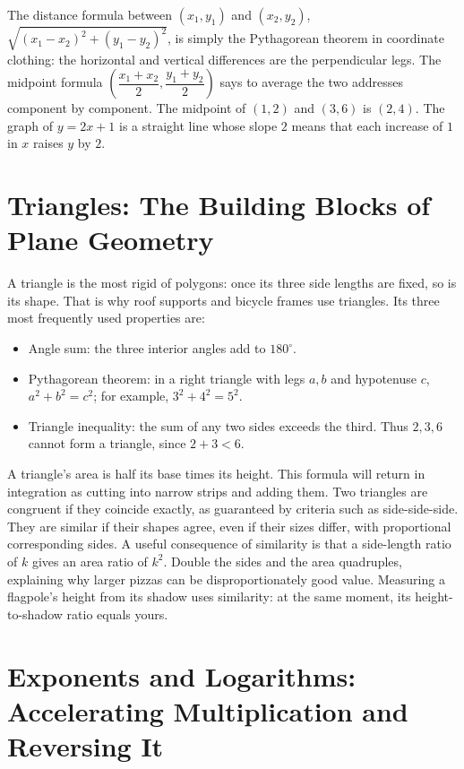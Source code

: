 The distance formula between $(x_1,y_1)$ and $(x_2,y_2)$, $\sqrt{(x_1-x_2)^2+(y_1-y_2)^2}$, is simply the Pythagorean theorem in coordinate clothing: the horizontal and vertical differences are the perpendicular legs. The midpoint formula $\left(\dfrac{x_1+x_2}{2},\dfrac{y_1+y_2}{2}\right)$ says to average the two addresses component by component. The midpoint of $(1,2)$ and $(3,6)$ is $(2,4)$. The graph of $y=2x+1$ is a straight line whose slope $2$ means that each increase of $1$ in $x$ raises $y$ by $2$.

\section{Triangles: The Building Blocks of Plane Geometry}

A triangle is the most rigid of polygons: once its three side lengths are fixed, so is its shape. That is why roof supports and bicycle frames use triangles. Its three most frequently used properties are:

\begin{itemize}
\item Angle sum: the three interior angles add to $180^\circ$.
\item Pythagorean theorem: in a right triangle with legs $a,b$ and hypotenuse $c$, $a^2+b^2=c^2$; for example, $3^2+4^2=5^2$.
\item Triangle inequality: the sum of any two sides exceeds the third. Thus $2,3,6$ cannot form a triangle, since $2+3<6$.
\end{itemize}

A triangle's area is half its base times its height. This formula will return in integration as cutting into narrow strips and adding them. Two triangles are congruent if they coincide exactly, as guaranteed by criteria such as side-side-side. They are similar if their shapes agree, even if their sizes differ, with proportional corresponding sides. A useful consequence of similarity is that a side-length ratio of $k$ gives an area ratio of $k^2$. Double the sides and the area quadruples, explaining why larger pizzas can be disproportionately good value. Measuring a flagpole's height from its shadow uses similarity: at the same moment, its height-to-shadow ratio equals yours.

\section{Exponents and Logarithms: Accelerating Multiplication and Reversing It}

